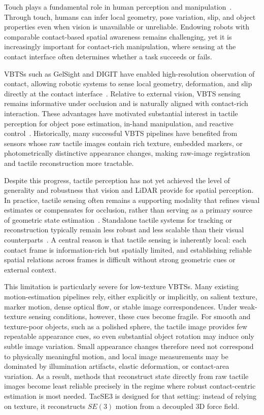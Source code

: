 \documentclass[letterpaper,10pt,journal,twoside]{IEEEtran}
\begin{document}
Touch plays a fundamental role in human perception and manipulation~\cite{lederman87}. Through touch, humans can infer local geometry, pose variation, slip, and object properties even when vision is unavailable or unreliable. Endowing robots with comparable contact-based spatial awareness remains challenging, yet it is increasingly important for contact-rich manipulation, where sensing at the contact interface often determines whether a task succeeds or fails.

VBTSs such as GelSight and DIGIT have enabled high-resolution observation of contact, allowing robotic systems to sense local geometry, deformation, and slip directly at the contact interface~\cite{yuan2017gelsight,lambeta2020digit}. Relative to external vision, VBTS sensing remains informative under occlusion and is naturally aligned with contact-rich interaction. These advantages have motivated substantial interest in tactile perception for object pose estimation, in-hand manipulation, and reactive control~\cite{bimbo16,huang24,suresh24}. Historically, many successful VBTS pipelines have benefited from sensors whose raw tactile images contain rich texture, embedded markers, or photometrically distinctive appearance changes, making raw-image registration and tactile reconstruction more tractable.

Despite this progress, tactile perception has not yet achieved the level of generality and robustness that vision and LiDAR provide for spatial perception. In practice, tactile sensing often remains a supporting modality that refines visual estimates or compensates for occlusion, rather than serving as a primary source of geometric state estimation~\cite{suresh24,li25}. Standalone tactile systems for tracking or reconstruction typically remain less robust and less scalable than their visual counterparts~\cite{sodhi22,wang18,newcombe11,li23}. A central reason is that tactile sensing is inherently local: each contact frame is information-rich but spatially limited, and establishing reliable spatial relations across frames is difficult without strong geometric cues or external context.

This limitation is particularly severe for low-texture VBTSs. Many existing motion-estimation pipelines rely, either explicitly or implicitly, on salient texture, marker motion, dense optical flow, or stable image correspondences. Under weak-texture sensing conditions, however, these cues become fragile. For smooth and texture-poor objects, such as a polished sphere, the tactile image provides few repeatable appearance cues, so even substantial object rotation may induce only subtle image variation. Small appearance changes therefore need not correspond to physically meaningful motion, and local image measurements may be dominated by illumination artifacts, elastic deformation, or contact-area variation. As a result, methods that reconstruct state directly from raw tactile images become least reliable precisely in the regime where robust contact-centric estimation is most needed. TacSE3 is designed for that setting: instead of relying on texture, it reconstructs $SE(3)$ motion from a decoupled 3D force field.
\end{document}
